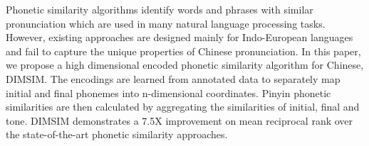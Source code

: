 Phonetic similarity algorithms identify words and phrases with similar pronunciation which are used in many natural language processing tasks. However, existing approaches are designed mainly for Indo-European languages and fail to capture the unique properties of Chinese pronunciation. In this paper, we propose a high dimensional encoded phonetic similarity algorithm for Chinese, DIMSIM. The encodings are learned from annotated data to separately map initial and final phonemes into n-dimensional coordinates. Pinyin phonetic similarities are then calculated by aggregating the similarities of initial, final and tone. DIMSIM demonstrates a 7.5X improvement on mean reciprocal rank over the state-of-the-art phonetic similarity approaches.

